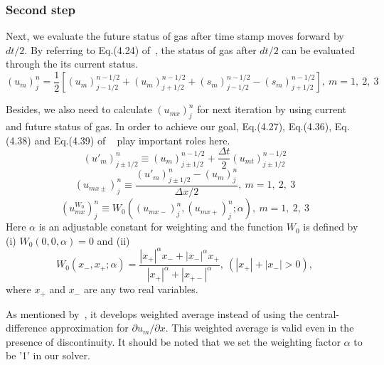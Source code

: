 \documentclass[a4paper,12pt,dvips]{article}
\begin{document}
\subsubsection{Second step}
 \label{subsubsection:second_step}
Next, we evaluate the future status of gas after time stamp moves forward 
by $dt/2$. By referring to Eq.(4.24) of~\cite{CESE_Shin_Chung_Chang_1995}, the 
status of gas after $dt/2$ can be evaluated through the its current status.
\begin{equation}
(u_{m})^{n}_{j}=\frac{1}{2}[(u_{m})^{n-1/2}_{j-1/2}+(u_{m})^{n-1/2}_{j+1/2}
+(s_{m})^{n-1/2}_{j-1/2}-(s_{m})^{n-1/2}_{j+1/2}],~m=1,~2,~3
\end{equation}

Besides, we also need to calculate $(u_{mx})^{n}_{j}$ for next iteration by 
using current and future status of gas. In order to achieve our goal, Eq.(4.27), 
Eq.(4.36), Eq.(4.38) and Eq.(4.39) of ~\cite{CESE_Shin_Chung_Chang_1995} play 
important roles here. 
\begin{equation}
(u'_{m})^{n}_{j\pm1/2}\equiv(u_{m})^{n-1/2}_{j\pm1/2}
+\frac{\Delta t}{2}(u_{mt})^{n-1/2}_{j\pm1/2}
\end{equation}
\begin{equation}
(u_{mx\pm})^{n}_{j}\equiv\frac{(u'_{m})^{n}_{j\pm1/2}-(u_{m})^{n}_{j}}{\Delta x/2}
,~m=1,~2,~3
\end{equation}
\begin{equation}
(u^{W_{0}}_{mx})^{n}_{j}\equiv W_{0}((u_{mx-})^{n}_{j},(u_{mx+})^{n}_{j};\alpha)
,~m=1,~2,~3
\end{equation}
Here $\alpha$ is an adjustable constant for weighting and the function $W_{0}$ 
is defined by (i) $W_{0}(0, 0, \alpha)=0$ and (ii)
\begin{equation}
W_{0}(x_{-},x_{+};\alpha )=\frac{|x_{+}|^{\alpha}x_{-}+|x_{-}|^{\alpha}x_{+}}
{|x_{+}|^{\alpha}+|x_{+-}|^{\alpha}},~(|x_{+}|+|x_{-}|>0),
\end{equation}
where $x_{+}$ and $x_{-}$ are any two real variables.

As mentioned by~\cite{CESE_Shin_Chung_Chang_1995}, it develops weighted average 
instead of using the central-difference approximation for $\partial u_{m}/\partial x$. 
This weighted average is valid even in the presence of discontinuity. It should 
be noted that we set the weighting factor $\alpha$ to be '1' in our solver.
\end{document}
